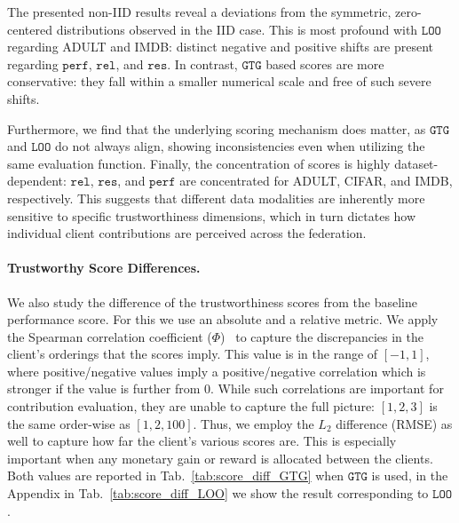 \documentclass{uai2026}
\begin{document}
The presented non-IID results reveal a deviations from the symmetric, zero-centered distributions observed in the IID case. This is most profound with $\mathtt{LOO}$ regarding ADULT and IMDB: distinct negative and positive shifts are present regarding $\mathtt{perf}$, $\mathtt{rel}$, and $\mathtt{res}$. In contrast, $\mathtt{GTG}$ based scores are more conservative: they fall within a smaller numerical scale and free of such severe shifts.

Furthermore, we find that the underlying scoring mechanism does matter, as $\mathtt{GTG}$ and $\mathtt{LOO}$ do not always align, showing inconsistencies even when utilizing the same evaluation function. Finally, the concentration of scores is highly dataset-dependent: $\mathtt{rel}$, $\mathtt{res}$, and $\mathtt{perf}$ are concentrated for ADULT, CIFAR, and  IMDB, respectively. This suggests that different data modalities are inherently more sensitive to specific trustworthiness dimensions, which in turn dictates how individual client contributions are perceived across the federation.

\paragraph{Trustworthy Score Differences. }

We also study the difference of the trustworthiness scores from the baseline performance score. For this we use an absolute and a relative metric. We apply the Spearman correlation coefficient ($\Phi$)~\cite{wissler1905spearman} to capture the discrepancies in the client's orderings that the scores imply. This value is in the range of $[-1,1]$, where positive/negative values imply a positive/negative correlation which is stronger if the value is further from 0. While such correlations are important for contribution evaluation, they are unable to capture the full picture: $[1,2,3]$ is the same order-wise as $[1,2,100]$. Thus, we employ the $L_2$ difference (RMSE) as well to capture how far the client's various scores are. This is especially important when any monetary gain or reward is allocated between the clients. Both values are reported in Tab.~\ref{tab:score_diff_GTG} when $\mathtt{GTG}$ is used, in the Appendix in Tab.~\ref{tab:score_diff_LOO} we show the result corresponding to $\mathtt{LOO}$.
\end{document}
